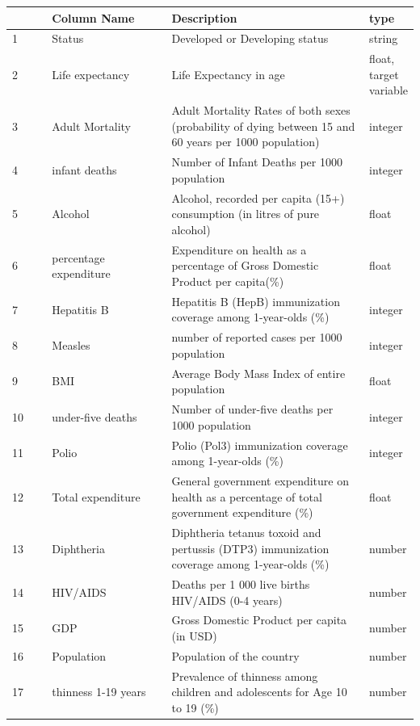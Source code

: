 \begin{table}
  \centering
  \begin{tabular}{p{0.1\linewidth} | p{0.3\linewidth}p{0.5\linewidth}p{0.1\linewidth}}
      & Column Name     & Description                                                             & type \\
    \hline
    1 & Status                 & Developed or Developing status                               & string \\
    2 & Life expectancy   & Life Expectancy in age                                             & float, target variable \\
    3 & Adult Mortality    & Adult Mortality Rates of both sexes (probability of dying between 15 and 60 years per 1000 population) & integer \\
    4 & infant deaths      & Number of Infant Deaths per 1000 population & integer \\
    5 & Alcohol              & Alcohol, recorded per capita (15+) consumption (in litres of pure alcohol) & float \\
    6 & percentage expenditure & Expenditure on health as a percentage of Gross Domestic Product per capita(\%) & float \\
    7 & Hepatitis B & Hepatitis B (HepB) immunization coverage among 1-year-olds (\%) & integer \\
    8 & Measles & number of reported cases per 1000 population & integer \\
    9 & BMI & Average Body Mass Index of entire population & float \\
    10 & under-five deaths & Number of under-five deaths per 1000 population & integer \\
    11 & Polio & Polio (Pol3) immunization coverage among 1-year-olds (\%) & integer \\
    12 & Total expenditure & General government expenditure on health as a percentage of total government expenditure (\%) & float \\
    13 & Diphtheria & Diphtheria tetanus toxoid and pertussis (DTP3) immunization coverage among 1-year-olds (\%) & number \\
    14 & HIV/AIDS & Deaths per 1 000 live births HIV/AIDS (0-4 years) & number \\
    15 & GDP & Gross Domestic Product per capita (in USD) & number \\
    16 & Population & Population of the country & number \\
    17 & thinness 1-19 years & Prevalence of thinness among children and adolescents for Age 10 to 19 (\%) & number \\

\end{tabular}
\end{table}
